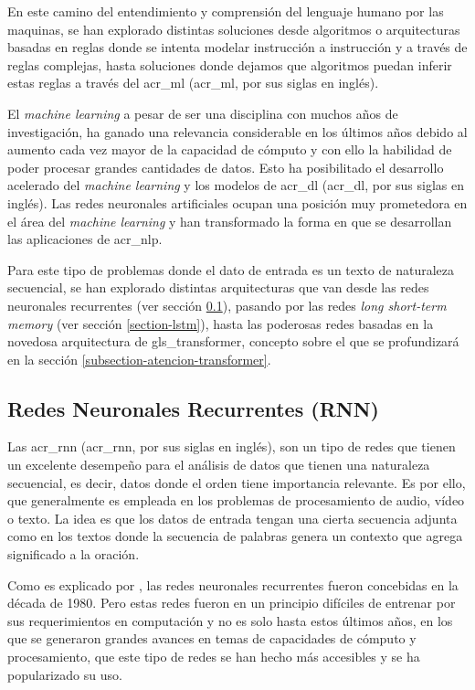 En este camino del entendimiento y comprensión del lenguaje humano por las maquinas, se han explorado distintas soluciones desde algoritmos o arquitecturas basadas en reglas donde se intenta modelar instrucción a instrucción y a través de reglas complejas, hasta soluciones donde dejamos que algoritmos puedan inferir estas reglas a través del \acrlong{acr_ml} (\acrshort{acr_ml}, por sus siglas en inglés). 

El \textit{machine learning} a pesar de ser una disciplina con muchos años de investigación, ha ganado una relevancia considerable en los últimos años debido al aumento cada vez mayor de la capacidad de cómputo y con ello la habilidad de poder procesar grandes cantidades de datos. Esto ha posibilitado el desarrollo acelerado del \textit{machine learning} y los modelos de \acrlong{acr_dl} (\acrshort{acr_dl}, por sus siglas en inglés). Las redes neuronales artificiales ocupan una posición muy prometedora en el área del \textit{machine learning} y han transformado la forma en que se desarrollan las aplicaciones de \acrshort{acr_nlp}. 

Para este tipo de problemas donde el dato de entrada es un texto de naturaleza secuencial, se han explorado distintas arquitecturas que van desde las redes neuronales recurrentes (ver sección \ref{section-rnn}), pasando por las redes \textit{long short-term memory} (ver sección \ref{section-lstm}), hasta las poderosas redes basadas en la novedosa arquitectura de \Gls{gls_transformer}, concepto sobre el que se profundizará en la sección \ref{subsection-atencion-transformer}.

\subsection{Redes Neuronales Recurrentes (RNN)}
\label{section-rnn}

Las \acrlong{acr_rnn} (\acrshort{acr_rnn}, por sus siglas en inglés), son un tipo de redes que tienen un excelente desempeño para el análisis de datos que tienen una naturaleza secuencial, es decir, datos donde el orden tiene importancia relevante. Es por ello, que generalmente es empleada en los problemas de procesamiento de audio, vídeo o texto. La idea es que los datos de entrada tengan una cierta secuencia adjunta como en los textos donde la secuencia de palabras genera un contexto que agrega significado a la oración. 

Como es explicado por \cite{torres2019deep}, las redes neuronales recurrentes fueron concebidas en la década de 1980. Pero estas redes fueron en un principio difíciles de entrenar por sus requerimientos en computación y no es solo hasta estos últimos años, en los que se generaron grandes avances en temas de capacidades de cómputo y procesamiento, que este tipo de redes se han hecho más accesibles y se ha popularizado su uso.

